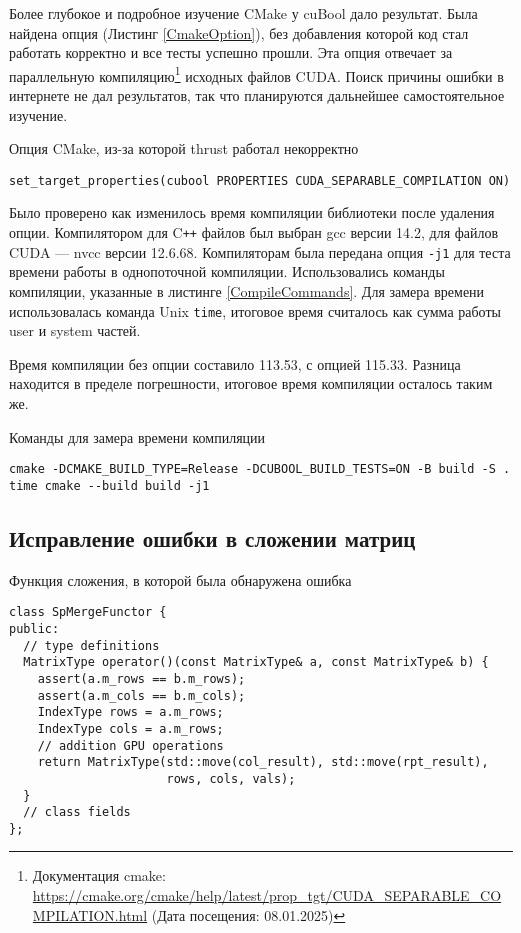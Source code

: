 Более глубокое и подробное изучение CMake у cuBool дало результат. Была найдена опция (Листинг \ref{CmakeOption}), без добавления которой код стал работать корректно и все тесты успешно прошли. Эта опция отвечает за параллельную компиляцию\footnote{
Документация cmake: \url{https://cmake.org/cmake/help/latest/prop_tgt/CUDA_SEPARABLE_COMPILATION.html}
 (Дата посещения: 08.01.2025)} исходных файлов CUDA. Поиск причины ошибки в интернете не дал результатов, так что планируются дальнейшее самостоятельное изучение.  

\begin{listing}
    \caption{Опция CMake, из-за которой thrust работал некорректно}
    \begin{verbatim}
set_target_properties(cubool PROPERTIES CUDA_SEPARABLE_COMPILATION ON)
  \end{verbatim}
\label{CmakeOption}
\end{listing}

Было проверено как изменилось время компиляции библиотеки после удаления опции. Компилятором для C\texttt{++} файлов был выбран gcc версии 14.2, для файлов CUDA --- nvcc версии 12.6.68. Компиляторам была передана опция \verb|-j1| для теста времени работы в однопоточной компиляции. Использовались команды компиляции, указанные в листинге \ref{CompileCommands}. Для замера времени использовалась команда Unix \verb|time|, итоговое время считалось как сумма работы user и system частей.

Время компиляции без опции составило 113.53, с опцией 115.33. Разница находится в пределе погрешности, итоговое время компиляции осталось таким же.

\begin{listing}
    \caption{Команды для замера времени компиляции}
    \begin{verbatim}
cmake -DCMAKE_BUILD_TYPE=Release -DCUBOOL_BUILD_TESTS=ON -B build -S .
time cmake --build build -j1
  \end{verbatim}
\label{CompileCommands}
\end{listing}

\subsection{Исправление ошибки в сложении матриц}

\begin{listing}
    \caption{Функция сложения, в которой была обнаружена ошибка}
    \begin{verbatim}
class SpMergeFunctor {
public:
  // type definitions
  MatrixType operator()(const MatrixType& a, const MatrixType& b) {
    assert(a.m_rows == b.m_rows);
    assert(a.m_cols == b.m_cols);  
    IndexType rows = a.m_rows;
    IndexType cols = a.m_rows;
    // addition GPU operations
    return MatrixType(std::move(col_result), std::move(rpt_result),
                      rows, cols, vals);
  }
  // class fields
};                      
  \end{verbatim}
  \label{AddBug}
\end{listing}

